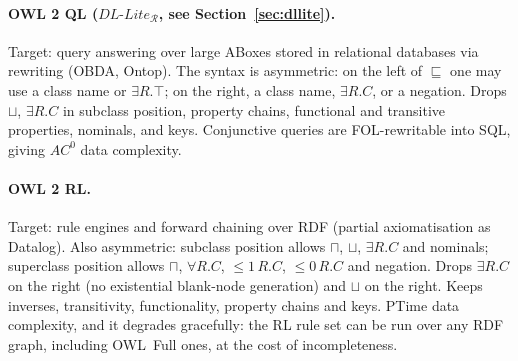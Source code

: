 \documentclass[11pt,a4paper]{article}
\newcommand{\dllite}[1]{\ensuremath{\textit{DL-Lite}_{#1}}}
\newcommand{\sub}{\sqsubseteq}
\begin{document}
\paragraph{OWL 2 QL (\dllite{\mathcal{R}}, see Section~\ref{sec:dllite}).}
Target: query answering over large ABoxes stored in relational databases via
rewriting (OBDA, Ontop). The syntax is asymmetric: on the left of $\sub$ one may
use a class name or $\exists R.\top$; on the right, a class name,
$\exists R.C$, or a negation. Drops $\sqcup$, $\exists R.C$ in subclass
position, property chains, functional and transitive properties, nominals, and
keys. Conjunctive queries are FOL-rewritable into SQL, giving $AC^0$ data
complexity.

\paragraph{OWL 2 RL.}
Target: rule engines and forward chaining over RDF (partial axiomatisation as
Datalog). Also asymmetric: subclass position allows $\sqcap$, $\sqcup$,
$\exists R.C$ and nominals; superclass position allows $\sqcap$,
$\forall R.C$, ${\leq}1\,R.C$, ${\leq}0\,R.C$ and negation. Drops
$\exists R.C$ on the right (no existential blank-node generation) and $\sqcup$
on the right. Keeps inverses, transitivity, functionality, property chains and
keys. PTime data complexity, and it degrades gracefully: the RL rule set can be
run over any RDF graph, including OWL~Full ones, at the cost of incompleteness.
\end{document}
